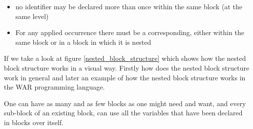 	\begin{itemize}
	\item no identifier may be declared more than once within the same block (at the same level) %
	\item For any applied occurrence there must be a corresponding, either within the same block or in a block in which it is nested %
	\end{itemize}
	
	
	If we take a look at figure \ref{nested_block_structure} which shows how the nested block structure works in a visual way. Firstly how does the nested block structure work in general and later an example of how the nested block structure works in the WAR programming language.
	
	One can have as many and as few blocks as one might need and want, and every sub-block of an existing block, can use all the variables that have been declared in blocks over itself. 
	
	
		
	 
	
	

	

	
	
	
